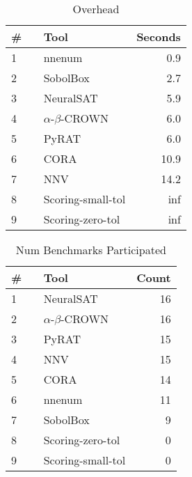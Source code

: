 


\begin{table}[h]
\begin{center}
\caption{Overhead} \label{tab:overhead}
{\setlength{\tabcolsep}{2pt}
\begin{tabular}[h]{@{}llr@{}}
\toprule
\textbf{\# ~} & \textbf{Tool} & \textbf{Seconds}\\
\midrule
1 & nnenum & 0.9 \\
2 & SobolBox & 2.7 \\
3 & NeuralSAT & 5.9 \\
4 & $\alpha$-$\beta$-CROWN & 6.0 \\
5 & PyRAT & 6.0 \\
6 & CORA & 10.9 \\
7 & NNV & 14.2 \\
8 & Scoring-small-tol & inf \\
9 & Scoring-zero-tol & inf \\
\bottomrule
\end{tabular}
}
\end{center}
\end{table}




\begin{table}[h]
\begin{center}
\caption{Num Benchmarks Participated} \label{tab:stats0}
{\setlength{\tabcolsep}{2pt}
\begin{tabular}[h]{@{}llr@{}}
\toprule
\textbf{\# ~} & \textbf{Tool} & \textbf{Count}\\
\midrule
1 & NeuralSAT & 16 \\
2 & $\alpha$-$\beta$-CROWN & 16 \\
3 & PyRAT & 15 \\
4 & NNV & 15 \\
5 & CORA & 14 \\
6 & nnenum & 11 \\
7 & SobolBox & 9 \\
8 & Scoring-zero-tol & 0 \\
9 & Scoring-small-tol & 0 \\
\bottomrule
\end{tabular}
}
\end{center}
\end{table}




